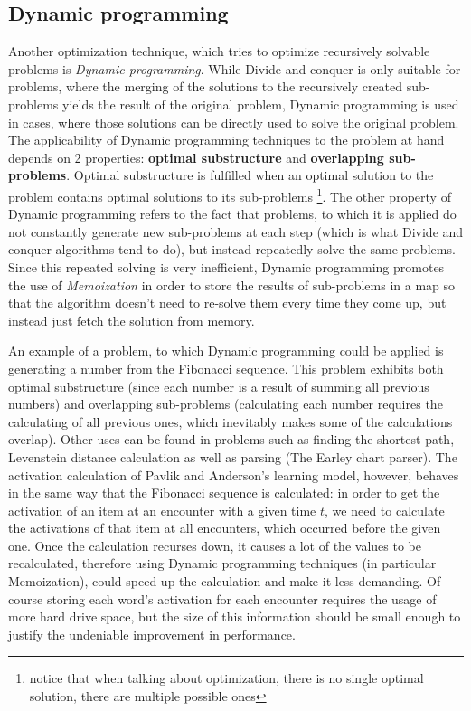 \documentclass[a4paper]{report}
\begin{document}
\subsection{Dynamic programming}
Another optimization technique, which tries to optimize recursively solvable problems is \textit{Dynamic programming}. While Divide and conquer is only suitable for problems, where the merging of the solutions to the recursively created sub-problems yields the result of the original problem, Dynamic programming is used in cases, where those solutions can be directly used to solve the original problem. The applicability of Dynamic programming techniques to the problem at hand depends on 2 properties: \textbf{optimal substructure} and \textbf{overlapping sub-problems}. Optimal substructure is fulfilled when an optimal solution to the problem contains optimal solutions to its sub-problems \footnote{notice that when talking about optimization, there is no single optimal solution, there are multiple possible ones}. The other property of Dynamic programming refers to the fact that problems, to which it is applied do not constantly generate new sub-problems at each step (which is what Divide and conquer algorithms tend to do), but instead repeatedly solve the same problems. Since this repeated solving is very inefficient, Dynamic programming promotes the use of \textit{Memoization} in order to store the results of sub-problems in a map so that the algorithm doesn't need to re-solve them every time they come up, but instead just fetch the solution from memory. \cite{algs_intro}

An example of a problem, to which Dynamic programming could be applied is generating a number from the Fibonacci sequence. This problem exhibits both optimal substructure (since each number is a result of summing all previous numbers) and overlapping sub-problems (calculating each number requires the calculating of all previous ones, which inevitably makes some of the calculations overlap). Other uses can be found in problems such as finding the shortest path, Levenstein distance calculation as well as parsing (The Earley chart parser). The activation calculation of Pavlik and Anderson's learning model, however, behaves in the same way that the Fibonacci sequence is calculated: in order to get the activation of an item at an encounter with a given time $t$, we need to calculate the activations of that item at all encounters, which occurred before the given one. Once the calculation recurses down, it causes a lot of the values to be recalculated, therefore using Dynamic programming techniques (in particular Memoization), could speed up the calculation and make it less demanding. Of course storing each word's activation for each encounter requires the usage of more hard drive space, but the size of this information should be small enough to justify the undeniable improvement in performance.
\end{document}
